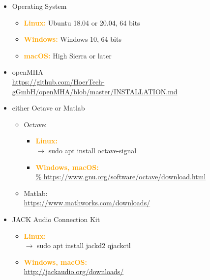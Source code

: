 \documentclass[11pt,a4paper,twoside]{article}
\newcommand{\+}{\discretionary{\mbox{\scriptsize$\hookleftarrow$}}{}{}}
\begin{document}
\begin{itemize}
\item \large{{Operating System}}
  \begin{itemize}
  \item \textcolor{orange}{\textbf{Linux:}} Ubuntu 18.04 or 20.04, 64 bits
  \item \textcolor{orange}{\textbf{Windows:}} Windows 10, 64 bits
  \item \textcolor{orange}{\textbf{macOS:}} High Sierra or later
  \end{itemize}

\item \large{{openMHA}}   \\
  \footnotesize{\url{https://github.com/HoerTech-gGmbH/openMHA/blob/master/INSTALLATION.md}}
\item \large{{either Octave or Matlab}}
  \begin{itemize}
  \item \large{{Octave:}}
    \begin{itemize}
    \item \textcolor{orange}{\textbf{\large{Linux:}}} \\
      $\rightarrow$ {\ttfamily sudo apt install octave-signal}
    \item \textcolor{orange}{\textbf{Windows, macOS:}} \\
      \footnotesize{\url{%
          https://www.gnu.org/software/octave/download.html}}
    \end{itemize}
  \item \large{{Matlab:}} \\
    \footnotesize{\url{https://www.mathworks.com/downloads/}}
  \end{itemize}
\item \large{{JACK Audio Connection Kit}}
  \begin{itemize}
  \item \textcolor{orange}{\textbf{Linux:}} \\
    $\rightarrow$ {\ttfamily sudo apt install jackd2 qjackctl}
  \item \textcolor{orange}{\textbf{Windows, macOS:}} \\
    \footnotesize{\url{http://jackaudio.org/downloads/}}
  \end{itemize}
\end{itemize}
\end{document}
